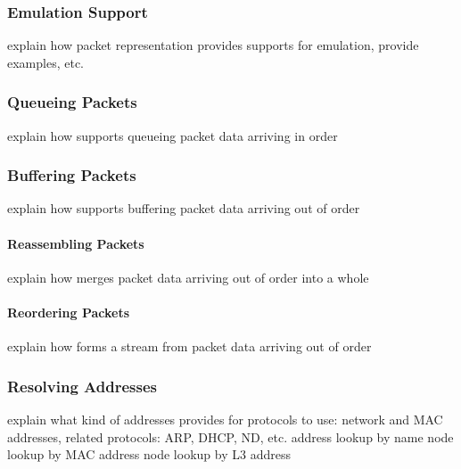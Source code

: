 

%
\subsubsection*{Emulation Support}
%
explain how \inet packet representation provides supports for emulation, provide examples, etc.



%
\subsubsection*{Queueing Packets}
%
explain how \inet supports queueing packet data arriving in order


%
\subsubsection*{Buffering Packets}
%
explain how \inet supports buffering packet data arriving out of order

%
\paragraph{Reassembling Packets}
%
explain how \inet merges packet data arriving out of order into a whole


%
\paragraph{Reordering Packets}
%
explain how \inet forms a stream from packet data arriving out of order


%
\subsubsection*{Resolving Addresses}
%
explain what kind of addresses \inet provides for protocols to use: network and MAC addresses, related protocols: ARP, DHCP, ND, etc.
address lookup by name
node lookup by MAC address
node lookup by L3 address

